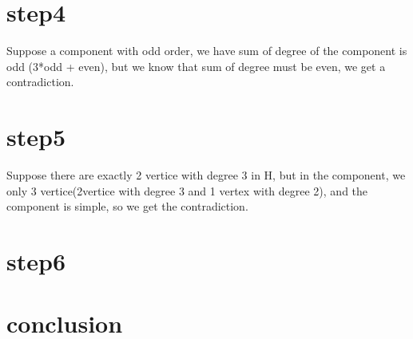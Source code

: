 \documentclass{article}
\begin{document}
\begin{CJK*}{UTF8}{bkai}
\section*{step4}
Suppose a component with odd order, we have sum of degree of the component is odd (3*odd + even), but we know that sum of degree must be even, we get a contradiction.
\section*{step5}
Suppose there are exactly 2 vertice with degree 3 in H, but in the component, we only 3 vertice(2vertice with degree 3 and 1 vertex with degree 2), and the component is simple, so we get the contradiction.
\section*{step6}

\section*{conclusion}

\end{CJK*}
\end{document}
